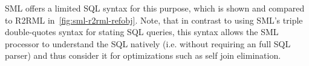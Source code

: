 SML offers a limited SQL syntax for this purpose, which is shown and compared to
R2RML in~\autoref{fig:sml-r2rml-refobj}. Note, that in contrast to using SML's
triple double-quotes syntax for stating SQL queries, this
syntax allows the SML processor to understand the SQL natively (i.e.
without requiring an full SQL parser) and thus consider it for optimizations
such as self join elimination.

%
%
%
%
%
%
%
%
%


